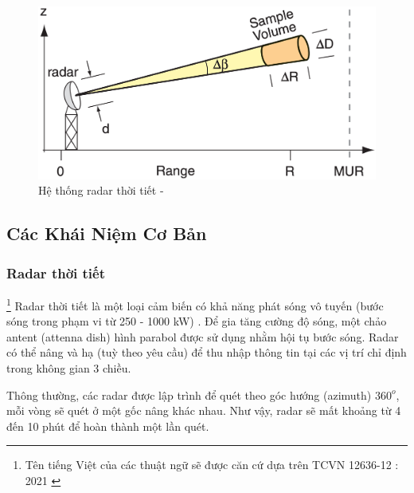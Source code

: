
\vspace{2cm}
\begin{figure}[H]
    \centering
    \includegraphics[width=1\linewidth]{Images/radar_concept.png}
    \vspace{1em}
    \caption{Hệ thống radar thời tiết - \cite{2022Weather}}
    \label{fig:radar}
\end{figure}
\newpage
\subsection{Các Khái Niệm Cơ Bản}


\subsubsection{Radar thời tiết}
\footnote{Tên tiếng Việt của các thuật ngữ sẽ được căn cứ dựa trên TCVN 12636-12 : 2021 \cite{vn_meteor_standard}}
Radar thời tiết là một loại cảm biến có khả năng phát sóng vô tuyến (bước sóng trong phạm vi từ 250 - 1000 kW) \cite{2022Weather}. Để gia tăng cường độ sóng, một chảo antent (attenna dish) hình parabol được sử dụng nhằm hội tụ bước sóng. Radar có thể nâng và hạ (tuỳ theo yêu cầu) để thu nhập thông tin tại các vị trí chỉ định trong không gian 3 chiều.

Thông thường, các radar được lập trình để quét theo góc hướng (azimuth) $360^o$, mỗi vòng sẽ quét ở một gốc nâng khác nhau. Như vậy, radar sẽ mất khoảng từ 4 đến 10 phút để hoàn thành một lần quét.

